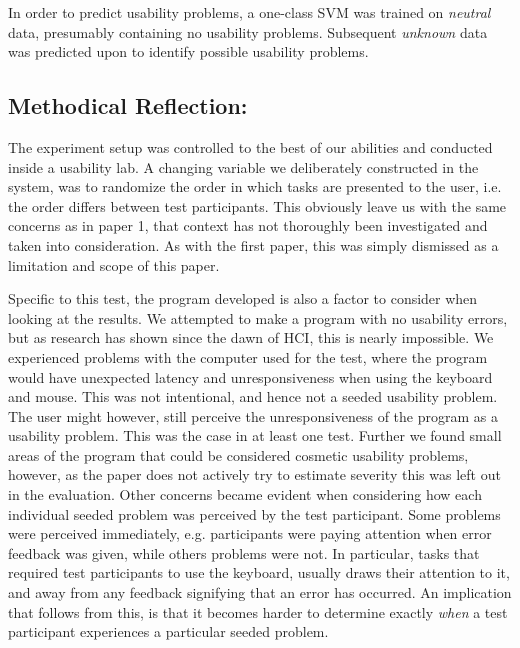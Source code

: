 In order to predict usability problems, a one-class SVM was trained on \textit{neutral} data, presumably containing no
usability problems. Subsequent \textit{unknown} data was predicted upon to identify possible usability problems.


\subsection{Methodical Reflection:}
The experiment setup was controlled to the best of our abilities and conducted inside a usability lab. A changing
variable we deliberately constructed in the system, was to randomize the order in which tasks are presented to the user,
i.e. the order differs between test participants.
This obviously leave us with the same concerns as in paper 1, that context has not thoroughly been investigated and taken
into consideration. As with the first paper, this was simply dismissed as a limitation and scope of this paper.

Specific to this test, the program developed is also a factor to consider when looking at the results.  We attempted to
make a program with no usability errors, but as research has shown since the dawn of HCI, this is nearly impossible.  We
experienced problems with the computer used for the test, where the program would have unexpected latency and unresponsiveness when using the keyboard and mouse. This was not intentional, and hence not a seeded usability problem.
The user might however, still perceive the unresponsiveness of the program as a usability problem. 
This was the case in at least one test.  
Further we found small areas of the program that could be considered cosmetic usability problems, however, as the paper does not actively try
to estimate severity this was left out in the evaluation. Other concerns became evident when considering how each
individual seeded problem was perceived by the test participant. Some problems were perceived immediately,
e.g. participants were paying attention when error feedback was given, while others problems were not. In particular,
tasks that required test participants to use the keyboard, usually draws their attention to it, and away from any
feedback signifying that an error has occurred. An implication that follows from this, is that it becomes harder to
determine exactly \textit{when} a test participant experiences a particular seeded problem.

